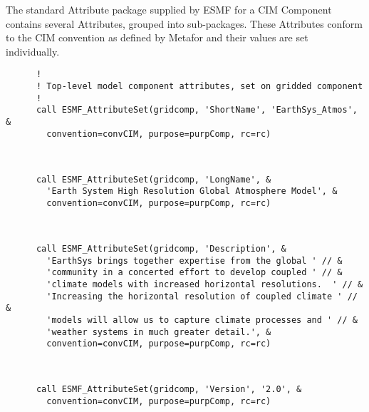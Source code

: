 
  \begin{sloppypar}
       The standard Attribute package supplied by ESMF for a CIM Component
       contains several Attributes, grouped into sub-packages.  These
       Attributes conform to the CIM convention as defined by Metafor and
       their values are set individually.
  \end{sloppypar} 

 \begin{verbatim}
      !
      ! Top-level model component attributes, set on gridded component
      !
      call ESMF_AttributeSet(gridcomp, 'ShortName', 'EarthSys_Atmos', &
        convention=convCIM, purpose=purpComp, rc=rc)
 
\end{verbatim}
 

 \begin{verbatim}

      call ESMF_AttributeSet(gridcomp, 'LongName', &
        'Earth System High Resolution Global Atmosphere Model', &
        convention=convCIM, purpose=purpComp, rc=rc)
 
\end{verbatim}
 

 \begin{verbatim}

      call ESMF_AttributeSet(gridcomp, 'Description', &
        'EarthSys brings together expertise from the global ' // &
        'community in a concerted effort to develop coupled ' // &
        'climate models with increased horizontal resolutions.  ' // &
        'Increasing the horizontal resolution of coupled climate ' // &
        'models will allow us to capture climate processes and ' // &
        'weather systems in much greater detail.', &
        convention=convCIM, purpose=purpComp, rc=rc)
 
\end{verbatim}
 

 \begin{verbatim}

      call ESMF_AttributeSet(gridcomp, 'Version', '2.0', &
        convention=convCIM, purpose=purpComp, rc=rc)
 
\end{verbatim}
 
